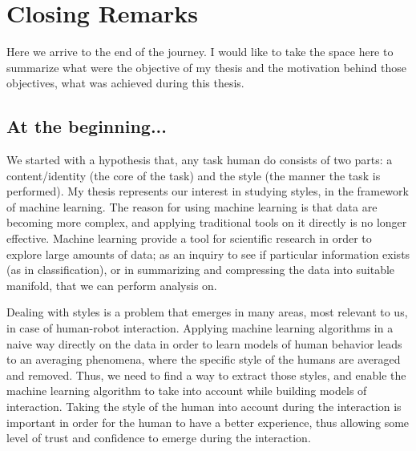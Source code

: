 \chapter{Closing Remarks} \label{ch:closing_remarks}
\minitoc%

\par Here we arrive to the end of the journey. I would like to take the space here to summarize what were the objective of my thesis and the motivation behind those objectives, what was achieved during this thesis.

\section{At the beginning...}

  \par We started with a hypothesis that, any task human do consists of two parts: a content/identity (the core of the task) and the style (the manner the task is performed). My thesis represents our interest in studying styles, in the framework of machine learning. The reason for using machine learning is that data are becoming more complex, and applying traditional tools on it directly is no longer effective. Machine learning provide a tool for scientific research in order to explore large amounts of data; as an inquiry to see if particular information exists (as in classification), or in summarizing and compressing the data into suitable manifold, that we can perform analysis on.

  \par Dealing with styles is a problem that emerges in many areas, most relevant to us, in case of human-robot interaction. Applying machine learning algorithms in a naive way directly on the data in order to learn models of human behavior leads to an averaging phenomena, where the specific style of the humans are averaged and removed. Thus, we need to find a way to extract those styles, and enable the machine learning algorithm to take into account while building models of interaction. Taking the style of the human into account during the interaction is important in order for the human to have a better experience, thus allowing some level of trust and confidence to emerge during the interaction.

